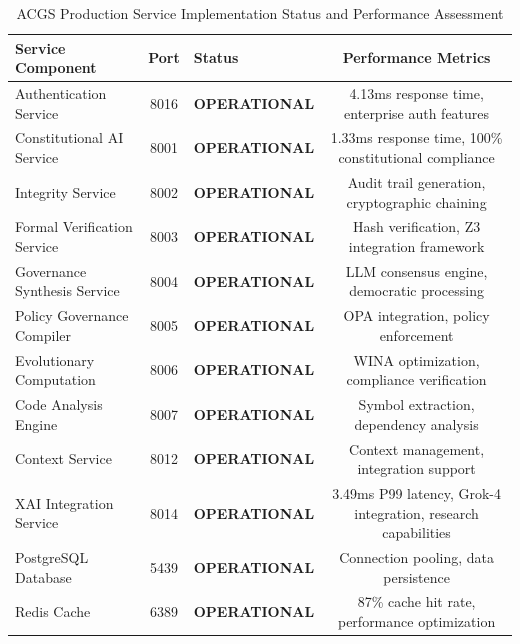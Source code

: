 \documentclass[manuscript,screen,9pt]{acmart}
\newcommand{\tablesize}{\footnotesize}
\newcommand{\tableheader}[1]{\textbf{#1}}
\begin{document}
\begin{table}[!htb]
\centering
\caption{ACGS Production Service Implementation Status and Performance Assessment}
\label{tab:implementation_status}
\tablesize
\begin{tabular}{@{}lclc@{}}
\toprule
\tableheader{Service Component} & \tableheader{Port} & \tableheader{Status} & \tableheader{Performance Metrics} \\
\midrule
Authentication Service & 8016 & \textbf{OPERATIONAL} & 4.13ms response time, enterprise auth features \\
Constitutional AI Service & 8001 & \textbf{OPERATIONAL} & 1.33ms response time, 100\% constitutional compliance \\
Integrity Service & 8002 & \textbf{OPERATIONAL} & Audit trail generation, cryptographic chaining \\
Formal Verification Service & 8003 & \textbf{OPERATIONAL} & Hash verification, Z3 integration framework \\
Governance Synthesis Service & 8004 & \textbf{OPERATIONAL} & LLM consensus engine, democratic processing \\
Policy Governance Compiler & 8005 & \textbf{OPERATIONAL} & OPA integration, policy enforcement \\
Evolutionary Computation & 8006 & \textbf{OPERATIONAL} & WINA optimization, compliance verification \\
Code Analysis Engine & 8007 & \textbf{OPERATIONAL} & Symbol extraction, dependency analysis \\
Context Service & 8012 & \textbf{OPERATIONAL} & Context management, integration support \\
XAI Integration Service & 8014 & \textbf{OPERATIONAL} & 3.49ms P99 latency, Grok-4 integration, research capabilities \\
\midrule
PostgreSQL Database & 5439 & \textbf{OPERATIONAL} & Connection pooling, data persistence \\
Redis Cache & 6389 & \textbf{OPERATIONAL} & 87\% cache hit rate, performance optimization \\
\bottomrule
\end{tabular}
\end{table}
\end{document}
